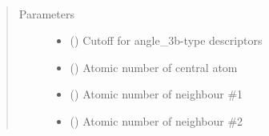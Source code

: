 \documentclass[letterpaper,10pt,english]{sphinxmanual}
\begin{document}
\begin{fulllineitems}
\label{\detokenize{descriptors:gap.descriptors.angle_3b}}~\begin{quote}\begin{description}
\item[{Parameters}] \leavevmode\begin{itemize}
\item {} 
 () \textendash{} Cutoff for angle\_3b-type descriptors

\item {} 
 () \textendash{} Atomic number of central atom

\item {} 
 () \textendash{} Atomic number of neighbour \#1

\item {} 
 () \textendash{} Atomic number of neighbour \#2

\end{itemize}

\end{description}\end{quote}

\end{fulllineitems}

\end{document}
